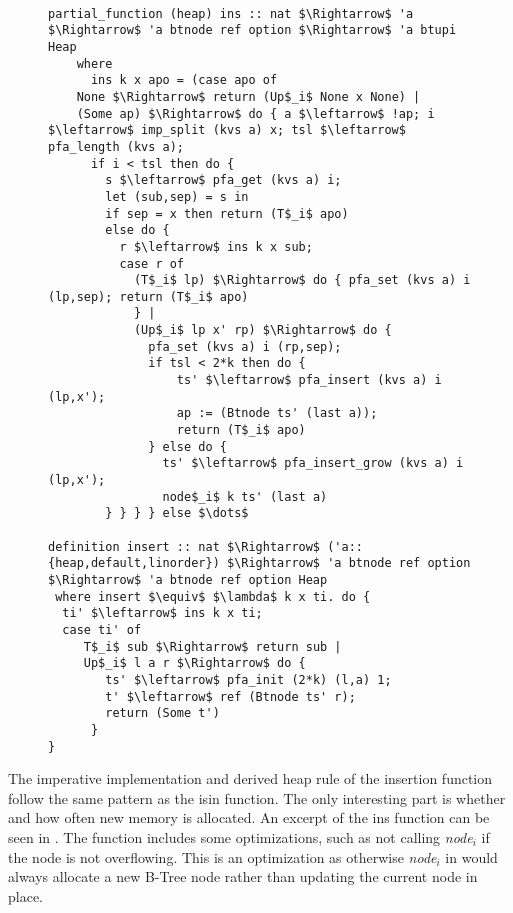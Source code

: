 \begin{figure}
\begin{lstlisting}[mathescape=true, language=Isabelle, label={lst:imp-ins-fun},
    caption={Excerpt of the imperative insert function}]

partial_function (heap) ins :: nat $\Rightarrow$ 'a $\Rightarrow$ 'a btnode ref option $\Rightarrow$ 'a btupi Heap 
    where 
      ins k x apo = (case apo of 
    None $\Rightarrow$ return (Up$_i$ None x None) | 
    (Some ap) $\Rightarrow$ do { a $\leftarrow$ !ap; i $\leftarrow$ imp_split (kvs a) x; tsl $\leftarrow$ pfa_length (kvs a); 
      if i < tsl then do { 
        s $\leftarrow$ pfa_get (kvs a) i; 
        let (sub,sep) = s in 
        if sep = x then return (T$_i$ apo) 
        else do { 
          r $\leftarrow$ ins k x sub; 
          case r of  
            (T$_i$ lp) $\Rightarrow$ do { pfa_set (kvs a) i (lp,sep); return (T$_i$ apo) 
            } | 
            (Up$_i$ lp x' rp) $\Rightarrow$ do { 
              pfa_set (kvs a) i (rp,sep); 
              if tsl < 2*k then do { 
                  ts' $\leftarrow$ pfa_insert (kvs a) i (lp,x'); 
                  ap := (Btnode ts' (last a)); 
                  return (T$_i$ apo) 
              } else do { 
                ts' $\leftarrow$ pfa_insert_grow (kvs a) i (lp,x'); 
                node$_i$ k ts' (last a) 
        } } } } else $\dots$

definition insert :: nat $\Rightarrow$ ('a::{heap,default,linorder}) $\Rightarrow$ 'a btnode ref option $\Rightarrow$ 'a btnode ref option Heap
 where insert $\equiv$ $\lambda$ k x ti. do {
  ti' $\leftarrow$ ins k x ti;
  case ti' of
     T$_i$ sub $\Rightarrow$ return sub |
     Up$_i$ l a r $\Rightarrow$ do {
        ts' $\leftarrow$ pfa_init (2*k) (l,a) 1;
        t' $\leftarrow$ ref (Btnode ts' r);
        return (Some t')
      }
}

\end{lstlisting}
\end{figure}

The imperative implementation and derived heap rule of the insertion function follow
the same pattern as the isin function.
The only interesting part is whether and how often new memory is allocated.
An excerpt of the ins function can be seen in .
The function includes some optimizations, such as not calling
\textit{node$_i$} if the node is not overflowing.
This is an optimization as otherwise \textit{node$_i$} in
 would always allocate a new B-Tree node
rather than updating the current node in place.

